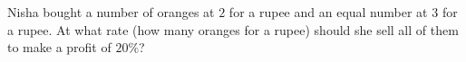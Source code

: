 Nisha bought a number of oranges at $2$ for a rupee and an equal number at $3$ for a rupee. At what rate (how many oranges for a rupee) should she sell all of them to make a profit of $20\%$?

